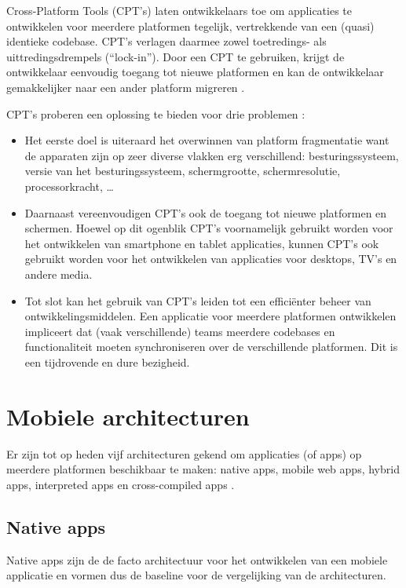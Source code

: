 \documentclass[a4paper]{IEEEconf}
\begin{document}
Cross-Platform Tools (CPT's) laten ontwikkelaars toe om applicaties te ontwikkelen voor meerdere platformen tegelijk, vertrekkende van een (quasi) identieke codebase. CPT's verlagen daarmee zowel toetredings- als uittredingsdrempels (``lock-in''). Door een CPT te gebruiken, krijgt de ontwikkelaar eenvoudig toegang tot nieuwe platformen en kan de ontwikkelaar gemakkelijker naar een ander platform migreren \cite{VMCPT:2012}.

CPT's proberen een oplossing te bieden voor drie problemen \cite{VMCPT:2012}:

\begin{itemize}
    \item Het eerste doel is uiteraard het overwinnen van platform fragmentatie want de apparaten zijn op zeer diverse vlakken erg verschillend: besturingssysteem, versie van het besturingssysteem, schermgrootte, schermresolutie, processorkracht, \ldots 
    \item Daarnaast vereenvoudigen CPT's ook de toegang tot nieuwe platformen en schermen. Hoewel op dit ogenblik CPT's voornamelijk gebruikt worden voor het ontwikkelen van smartphone en tablet applicaties, kunnen CPT's ook gebruikt worden voor het ontwikkelen van applicaties voor desktops, TV's en andere media.
    \item Tot slot kan het gebruik van CPT's leiden tot een efficiënter beheer van ontwikkelingsmiddelen. Een applicatie voor meerdere platformen ontwikkelen impliceert dat (vaak verschillende) teams meerdere codebases en functionaliteit moeten synchroniseren over de verschillende platformen. Dit is een tijdrovende en dure bezigheid.
\end{itemize}

\section{Mobiele architecturen}

Er zijn tot op heden vijf architecturen gekend om applicaties (of apps) op meerdere platformen beschikbaar te maken: native apps, mobile web apps, hybrid apps, interpreted apps en cross-compiled apps \cite{Friese}.

\subsection{Native apps}

Native apps zijn de de facto architectuur voor het ontwikkelen van een mobiele applicatie en vormen dus de baseline voor de vergelijking van de architecturen. 
\end{document}
